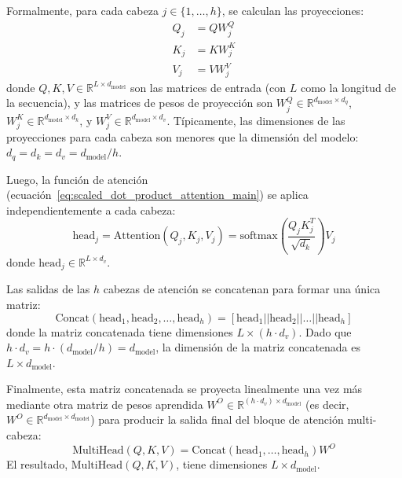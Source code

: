 Formalmente, para cada cabeza $j \in \{1, \ldots, h\}$, se calculan las proyecciones:
\begin{align}
Q_j &= Q W_j^Q \label{eq:mha_q_proj} \\
K_j &= K W_j^K \label{eq:mha_k_proj} \\
V_j &= V W_j^V \label{eq:mha_v_proj}
\end{align}
donde $Q, K, V \in \mathbb{R}^{L \times d_{\text{model}}}$ son las matrices de entrada (con $L$ como la longitud de la secuencia), y las matrices de pesos de proyección son $W_j^Q \in \mathbb{R}^{d_{\text{model}} \times d_q}$, $W_j^K \in \mathbb{R}^{d_{\text{model}} \times d_k}$, y $W_j^V \in \mathbb{R}^{d_{\text{model}} \times d_v}$. Típicamente, las dimensiones de las proyecciones para cada cabeza son menores que la dimensión del modelo: $d_q = d_k = d_v = d_{\text{model}}/h$.

Luego, la función de atención (ecuación~\ref{eq:scaled_dot_product_attention_main}) se aplica independientemente a cada cabeza:
\begin{equation}
\text{head}_j = \text{Attention}(Q_j, K_j, V_j) = \text{softmax}\left(\frac{Q_j K_j^T}{\sqrt{d_k}}\right)V_j
\label{eq:mha_head_j}
\end{equation}
donde $\text{head}_j \in \mathbb{R}^{L \times d_v}$.

Las salidas de las $h$ cabezas de atención se concatenan para formar una única matriz:
\begin{equation}
\text{Concat}(\text{head}_1, \text{head}_2, \ldots, \text{head}_h) = [\text{head}_1 || \text{head}_2 || \ldots || \text{head}_h]
\label{eq:mha_concat}
\end{equation}
donde la matriz concatenada tiene dimensiones $L \times (h \cdot d_v)$. Dado que $h \cdot d_v = h \cdot (d_{\text{model}}/h) = d_{\text{model}}$, la dimensión de la matriz concatenada es $L \times d_{\text{model}}$.

Finalmente, esta matriz concatenada se proyecta linealmente una vez más mediante otra matriz de pesos aprendida $W^O \in \mathbb{R}^{(h \cdot d_v) \times d_{\text{model}}}$ (es decir, $W^O \in \mathbb{R}^{d_{\text{model}} \times d_{\text{model}}}$) para producir la salida final del bloque de atención multi-cabeza:
\begin{equation}
\text{MultiHead}(Q, K, V) = \text{Concat}(\text{head}_1, \ldots, \text{head}_h) W^O
\label{eq:mha_final}
\end{equation}
El resultado, $\text{MultiHead}(Q, K, V)$, tiene dimensiones $L \times d_{\text{model}}$.

